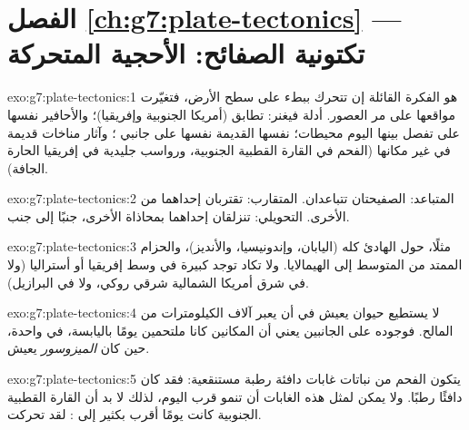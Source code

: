\section*{الفصل \ref{ch:g7:plate-tectonics} --- تكتونية الصفائح: الأحجية المتحركة}

\begin{solution}{exo:g7:plate-tectonics:1}
 هو الفكرة القائلة إن  تتحرك ببطء على
سطح الأرض، فتغيّرت مواقعها على مر العصور.
أدلة فيغنر: تطابق  (أمريكا الجنوبية وإفريقيا)؛
والأحافير نفسها على  تفصل بينها اليوم محيطات؛  نفسها  القديمة نفسها على جانبي ؛ وآثار مناخات قديمة في غير
مكانها (الفحم في القارة القطبية الجنوبية، ورواسب جليدية في إفريقيا الحارة الجافة).
\end{solution}

\begin{solution}{exo:g7:plate-tectonics:2}
المتباعد: الصفيحتان تتباعدان. المتقارب: تقتربان إحداهما من الأخرى.
التحويلي: تنزلقان إحداهما بمحاذاة الأخرى، جنبًا إلى جنب.
\end{solution}

\begin{solution}{exo:g7:plate-tectonics:3}
مثلًا، حول  الهادئ كله (اليابان، وإندونيسيا، والأنديز)،
والحزام الممتد من  المتوسط إلى الهيمالايا. ولا تكاد توجد
 كبيرة في وسط إفريقيا أو أستراليا (ولا في شرق أمريكا
الشمالية شرقي  روكي، ولا في البرازيل).
\end{solution}

\begin{solution}{exo:g7:plate-tectonics:4}
لا يستطيع حيوان يعيش في  أن يعبر آلاف الكيلومترات من
 المالح. فوجوده على الجانبين يعني أن المكانين كانا ملتحمين يومًا
باليابسة، في  واحدة، حين كان \emph{الميزوسور} يعيش.
\end{solution}

\begin{solution}{exo:g7:plate-tectonics:5}
يتكون الفحم من نباتات غابات دافئة رطبة مستنقعية: فقد كان 
دافئًا رطبًا. ولا يمكن لمثل هذه الغابات أن تنمو قرب  اليوم، لذلك
لا بد أن القارة القطبية الجنوبية كانت يومًا أقرب بكثير إلى : لقد تحركت.
\end{solution}

